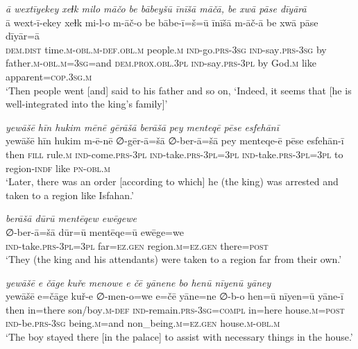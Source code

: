 \ea \label{KŠ.46}
\textit{ā wextīyekey xeɫk milo māčo be bābeyšū īnīšā māčā, be xwā pāse dīyārā} \\ 
\gll ā wext-ī-ekey xeɫk mi-l-o m-āč-o be bābe-ī=š=ū īnīšā m-āč-ā be xwā pāse dīyār=ā \\ 
 \textsc{dem.dist} time\textsc{.m}\textsc{-obl}\textsc{.m}\textsc{-def}\textsc{.obl}\textsc{.m} people\textsc{.m} \textsc{ind-}go\textsc{.prs}\textsc{-3sg} \textsc{ind-}say\textsc{.prs}\textsc{-3sg} by father\textsc{.m}\textsc{-obl}\textsc{.m}\textsc{=3sg}=and \textsc{dem.prox}\textsc{.obl}\textsc{.3pl} \textsc{ind-}say\textsc{.prs}\textsc{-3pl} by God\textsc{.m} like apparent\textsc{=cop}\textsc{.3sg}\textsc{.m} \\ 
\glt `Then people went [and] said to his father and so on, ‘Indeed, it seems that [he is well-integrated into the king’s family]'
\z 
 
\ea \label{KŠ.47}
\textit{yewāšē hīn hukim mēnē gērāšā berāšā pey menteqē pēse esfehānī} \\ 
\gll yewāšē hīn hukim m-ē-nē ∅-gēr-ā=šā ∅-ber-ā=šā pey menteqe-ē pēse esfehān-ī \\ 
 then \textsc{fill} rule\textsc{.m} \textsc{ind-}come\textsc{.prs}\textsc{-3pl} \textsc{ind-}take\textsc{.prs}\textsc{-3pl}\textsc{=3pl} \textsc{ind-}take\textsc{.prs}\textsc{-3pl}\textsc{=3pl} to region\textsc{-indf} like \textsc{pn}\textsc{-obl}\textsc{.m} \\ 
\glt `Later, there was an order [according to which] he (the king) was arrested and taken to a region like Isfahan.'
\z 
 
\ea \label{KŠ.48}
\textit{berāšā dūrū mentēqew ewēgewe} \\ 
\gll ∅-ber-ā=šā dūr=ū mentēqe=ū ewēge=we \\ 
 \textsc{ind-}take\textsc{.prs}\textsc{-3pl}\textsc{=3pl} far\textsc{=ez.gen} region\textsc{.m}\textsc{=ez.gen} there\textsc{=\textsc{post}} \\ 
\glt `They (the king and his attendants) were taken to a region far from their own.'
\z 
 
\ea \label{KŠ.49}
\textit{yewāšē e čāge kuře menowe e čē yānene bo henū nīyenū yāney} \\ 
\gll yewāšē e=čāge kuř-e ∅-men-o=we e=čē yāne=ne ∅-b-o hen=ū nīyen=ū yāne-ī \\ 
 then in=there son/boy\textsc{.m}\textsc{-def} \textsc{ind-}remain\textsc{.prs}\textsc{-3sg}\textsc{=compl} in=here house\textsc{.m}\textsc{=\textsc{post}} \textsc{ind-}be\textsc{.prs}\textsc{-3sg} being\textsc{.m}=and non\_being\textsc{.m}\textsc{=ez.gen} house\textsc{.m}\textsc{-obl}\textsc{.m} \\ 
\glt `The boy stayed there [in the palace] to assist with necessary things in the house.'
\z 
 
